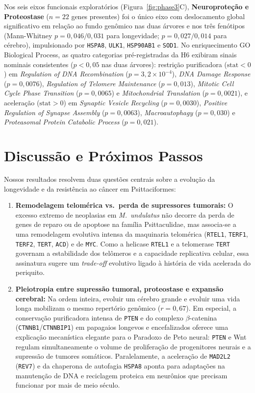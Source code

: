 \documentclass[10pt,a4paper,twocolumn]{article}
\begin{document}
Nos seis eixos funcionais exploratórios (Figura~\ref{fig:phase3}C), \textbf{Neuroproteção e Proteostase} ($n = 22$ genes presentes) foi o único eixo com deslocamento global significativo em relação ao fundo genômico nas duas árvores e nos três fenótipos (Mann-Whitney $p = 0,046 / 0,031$ para longevidade; $p = 0,027 / 0,014$ para cérebro), impulsionado por \texttt{HSPA8}, \texttt{ULK1}, \texttt{HSP90AB1} e \texttt{SOD1}. No enriquecimento GO Biological Process, as quatro categorias pré-registradas da H6 exibiram sinais nominais consistentes ($p < 0,05$ nas duas árvores): restrição purificadora ($\text{stat} < 0$) em \textit{Regulation of DNA Recombination} ($p = 3,2 \times 10^{-4}$), \textit{DNA Damage Response} ($p = 0,0076$), \textit{Regulation of Telomere Maintenance} ($p = 0,013$), \textit{Mitotic Cell Cycle Phase Transition} ($p = 0,0065$) e \textit{Mitochondrial Translation} ($p = 0,0021$), e aceleração ($\text{stat} > 0$) em \textit{Synaptic Vesicle Recycling} ($p = 0,0030$), \textit{Positive Regulation of Synapse Assembly} ($p = 0,0063$), \textit{Macroautophagy} ($p = 0,030$) e \textit{Proteasomal Protein Catabolic Process} ($p = 0,021$).

\section{Discussão e Próximos Passos}

Nossos resultados resolvem duas questões centrais sobre a evolução da longevidade e da resistência ao câncer em Psittaciformes:
\begin{enumerate}
    \item \textbf{Remodelagem telomérica vs.\ perda de supressores tumorais:} O excesso extremo de neoplasias em \textit{M.\ undulatus} não decorre da perda de genes de reparo ou de apoptose na família Psittaculidae, mas associa-se a uma remodelagem evolutiva intensa da maquinaria telomérica (\texttt{RTEL1}, \texttt{TERF1}, \texttt{TERF2}, \texttt{TERT}, \texttt{ACD}) e de \texttt{MYC}. Como a helicase \texttt{RTEL1} e a telomerase \texttt{TERT} governam a estabilidade dos telômeros e a capacidade replicativa celular, essa assinatura sugere um \textit{trade-off} evolutivo ligado à história de vida acelerada do periquito.
    \item \textbf{Pleiotropia entre supressão tumoral, proteostase e expansão cerebral:} Na ordem inteira, evoluir um cérebro grande e evoluir uma vida longa mobilizam o mesmo repertório genômico ($r = 0,67$). Em especial, a conservação purificadora intensa de \texttt{PTEN} e do complexo $\beta$-catenina (\texttt{CTNNB1}/\texttt{CTNNBIP1}) em papagaios longevos e encefalizados oferece uma explicação mecanística elegante para o Paradoxo de Peto neural: \texttt{PTEN} e Wnt regulam simultaneamente o volume de proliferação de progenitores neurais e a supressão de tumores somáticos. Paralelamente, a aceleração de \texttt{MAD2L2} (\texttt{REV7}) e da chaperona de autofagia \texttt{HSPA8} aponta para adaptações na manutenção de DNA e reciclagem proteica em neurônios que precisam funcionar por mais de meio século.
\end{enumerate}
\end{document}
